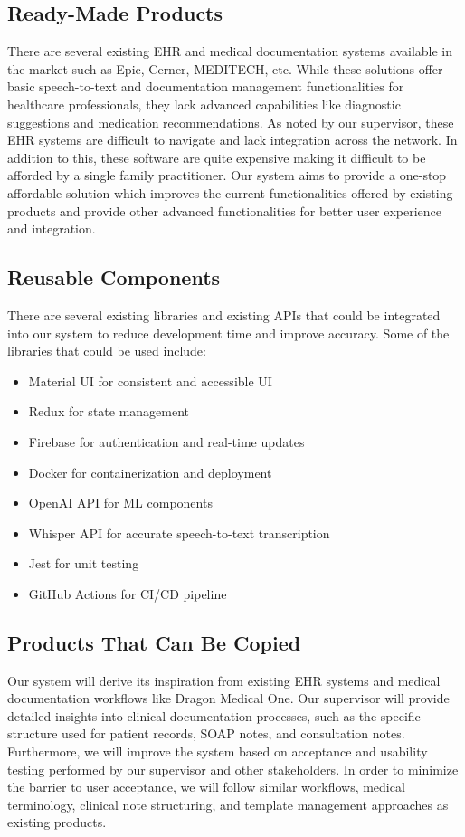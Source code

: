 \documentclass[12pt]{article}
\begin{document}
\begin{itemize}
\subsection{Ready-Made Products}
There are several existing EHR and medical documentation systems available in the market such as Epic, Cerner, MEDITECH, etc. While these solutions offer basic speech-to-text and documentation management functionalities for healthcare professionals, they lack advanced capabilities like diagnostic suggestions and medication recommendations. As noted by our supervisor, these EHR systems are difficult to navigate and lack integration across the network. In addition to this, these software are quite expensive making it difficult to be afforded by a single family practitioner. Our system aims to provide a one-stop affordable solution which improves the current functionalities offered by existing products and provide other advanced functionalities for better user experience and integration.

\subsection{Reusable Components}
There are several existing libraries and existing APIs that could be integrated into our system to reduce development time and improve accuracy. Some of the libraries that could be used include:

\begin{itemize}
  \item Material UI for consistent and accessible UI
  \item Redux for state management
  \item Firebase for authentication and real-time updates
  \item Docker for containerization and deployment
  \item OpenAI API for ML components
  \item Whisper API for accurate speech-to-text transcription
  \item Jest for unit testing
  \item GitHub Actions for CI/CD pipeline 
\end{itemize}

\subsection{Products That Can Be Copied}
Our system will derive its inspiration from existing EHR systems and medical documentation workflows like Dragon Medical One. Our supervisor will provide detailed insights into clinical documentation processes, such as the specific structure used for patient records, SOAP notes, and consultation notes. Furthermore, we will improve the system based on acceptance and usability testing performed by our supervisor and other stakeholders. In order to minimize the barrier to user acceptance, we will follow similar workflows, medical terminology, clinical note structuring, and template management approaches as existing products.



\end{itemize}
\end{document}
